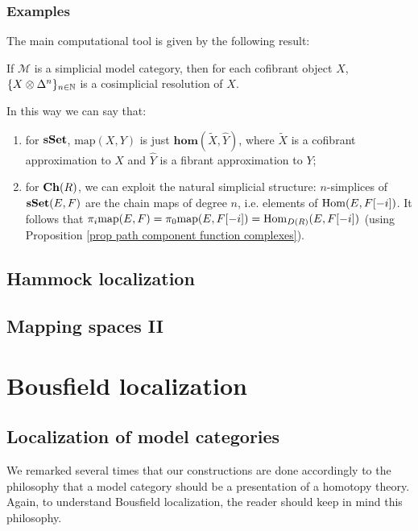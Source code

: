 \begin{refsection}
\subsubsection{Examples}

The main computational tool is given by the following result:

\begin{lemma}
If $\mathcal M$ is a simplicial model category, then for each cofibrant object $X$, $\{X \otimes \Delta^n\}_{n \in \mathbb{N}}$ is a cosimplicial resolution of $X$.
\end{lemma}

In this way we can say that:
\begin{enumerate}
\item for $\mathbf{s\,\!\mathbf{Set}}$, $\mathrm{map}(X,Y)$ is just $\mathbf{hom}(\widetilde{X}, \widehat{Y})$, where $\widetilde{X}$ is a cofibrant approximation to $X$ and $\widehat{Y}$ is a fibrant approximation to $Y$;
\item for $\mathbf{Ch}(R)$, we can exploit the natural simplicial structure: $n$-simplices of $\mathbf{s\,\!\mathbf{Set}}(E,F)$ are the chain maps of degree $n$, i.e. elements of $\mathrm{Hom}(E,F[-i])$. It follows that $\pi_i \mathrm{map}(E,F) = \pi_0 \mathrm{map}(E,F[-i]) = \mathrm{Hom}_{D(R)}(E,F[-i])$ (using Proposition \ref{prop path component function complexes}).
\end{enumerate}

\subsection{Hammock localization}

\subsection{Mapping spaces II}

\section{Bousfield localization}

\subsection{Localization of model categories}

We remarked several times that our constructions are done accordingly to the philosophy that a model category should be a presentation of a homotopy theory. Again, to understand Bousfield localization, the reader should keep in mind this philosophy.


\end{refsection}

